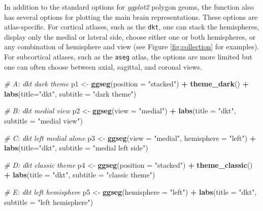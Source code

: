 \documentclass[fleqn,10pt]{wlpeerj} %
\newenvironment{Shaded}{\begin{snugshade}}{\end{snugshade}}
\newcommand{\CommentTok}[1]{\textcolor[rgb]{0.56,0.35,0.01}{\textit{#1}}}
\newcommand{\DataTypeTok}[1]{\textcolor[rgb]{0.13,0.29,0.53}{#1}}
\newcommand{\KeywordTok}[1]{\textcolor[rgb]{0.13,0.29,0.53}{\textbf{#1}}}
\newcommand{\NormalTok}[1]{#1}
\newcommand{\OperatorTok}[1]{\textcolor[rgb]{0.81,0.36,0.00}{\textbf{#1}}}
\newcommand{\StringTok}[1]{\textcolor[rgb]{0.31,0.60,0.02}{#1}}
\begin{document}
In addition to the standard options for \emph{ggplot2} polygon geoms, the function also has several options for plotting the main brain representations.
These options are atlas-specific.
For cortical atlases, such as the \texttt{dkt}, one can stack the hemispheres, display only the medial or lateral side, choose either one or both hemispheres, or any combination of hemisphere and view (see Figure \ref{fig:collection} for examples).
For subcortical atlases, such as the \texttt{aseg} atlas, the options are more limited but one can often choose between axial, sagittal, and coronal views.

\begin{Shaded}
\begin{Highlighting}[]
\CommentTok{\# A: dkt dark theme}
\NormalTok{p1 <{-}}\StringTok{ }\KeywordTok{ggseg}\NormalTok{(}\DataTypeTok{position =} \StringTok{"stacked"}\NormalTok{) }\OperatorTok{+}
\StringTok{  }\KeywordTok{theme\_dark}\NormalTok{() }\OperatorTok{+}
\StringTok{  }\KeywordTok{labs}\NormalTok{(}\DataTypeTok{title=}\StringTok{"dkt"}\NormalTok{, }\DataTypeTok{subtitle =} \StringTok{"dark theme"}\NormalTok{)}

\CommentTok{\# B: dkt medial view}
\NormalTok{p2 <{-}}\StringTok{ }\KeywordTok{ggseg}\NormalTok{(}\DataTypeTok{view =} \StringTok{"medial"}\NormalTok{) }\OperatorTok{+}
\StringTok{  }\KeywordTok{labs}\NormalTok{(}\DataTypeTok{title =} \StringTok{"dkt"}\NormalTok{, }\DataTypeTok{subtitle =} \StringTok{"medial view"}\NormalTok{)}

\CommentTok{\# C: dkt left medial alone}
\NormalTok{p3 <{-}}\StringTok{ }\KeywordTok{ggseg}\NormalTok{(}\DataTypeTok{view =} \StringTok{"medial"}\NormalTok{,}
            \DataTypeTok{hemisphere =} \StringTok{"left"}\NormalTok{) }\OperatorTok{+}
\StringTok{  }\KeywordTok{labs}\NormalTok{(}\DataTypeTok{title=}\StringTok{"dkt"}\NormalTok{, }\DataTypeTok{subtitle =} \StringTok{"medial left side"}\NormalTok{)}

\CommentTok{\# D: dkt classic theme}
\NormalTok{p4 <{-}}\StringTok{ }\KeywordTok{ggseg}\NormalTok{(}\DataTypeTok{position =} \StringTok{"stacked"}\NormalTok{) }\OperatorTok{+}
\StringTok{  }\KeywordTok{theme\_classic}\NormalTok{() }\OperatorTok{+}
\StringTok{  }\KeywordTok{labs}\NormalTok{(}\DataTypeTok{title =} \StringTok{"dkt"}\NormalTok{, }\DataTypeTok{subtitle =} \StringTok{"classic theme"}\NormalTok{)}


\CommentTok{\# E: dkt left hemisphere}
\NormalTok{p5 <{-}}\StringTok{ }\KeywordTok{ggseg}\NormalTok{(}\DataTypeTok{hemisphere =} \StringTok{"left"}\NormalTok{) }\OperatorTok{+}
\StringTok{  }\KeywordTok{labs}\NormalTok{(}\DataTypeTok{title =} \StringTok{"dkt"}\NormalTok{, }\DataTypeTok{subtitle =} \StringTok{"left hemisphere"}\NormalTok{)}


\end{Highlighting}
\end{Shaded}
\end{document}
